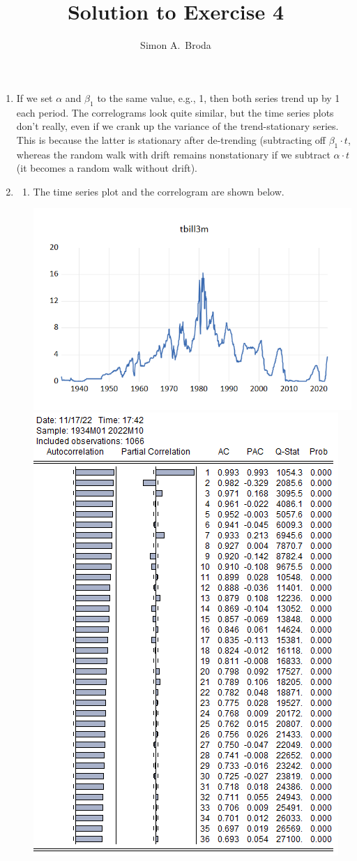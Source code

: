 \documentclass[11pt, a4paper]{article}
\begin{document}
\title{Solution to Exercise 4}
\author{Simon A.\ Broda}
\date{}
\maketitle

\begin{enumerate}
\item If we set $\alpha$ and $\beta_1$ to the same value, e.g., 1, then both series trend up by 1 each period. The correlograms look quite similar, but the time series plots don't really, even if we crank up the variance of the trend-stationary series. This is because the latter is stationary after de-trending (subtracting off $\beta_1\cdot t$, whereas the random walk with drift remains nonstationary if we subtract $\alpha\cdot t$ (it becomes a random walk without drift).
\item
\begin{enumerate}
\item The time series plot and the correlogram are shown below.
\begin{center}
\includegraphics[width=.6\textwidth]{tbillplot}
\includegraphics[width=.6\textwidth]{tbillcorr}

\end{center}
\end{enumerate}
\end{enumerate}
\end{document}
